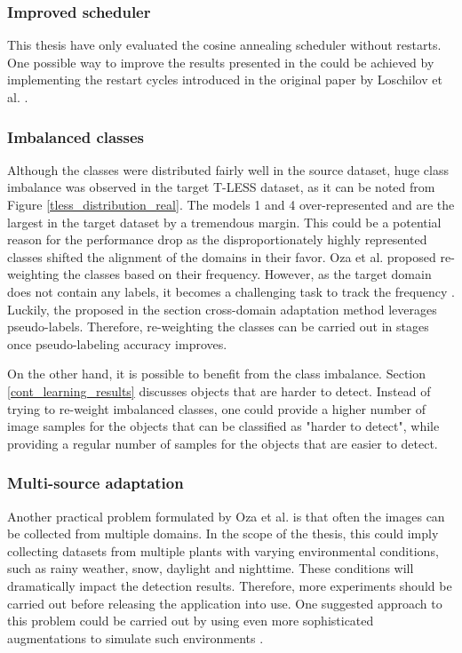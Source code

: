\documentclass[english, 12pt, a4paper, elec, utf8, a-1b, online]{aaltothesis}
\begin{document}
\subsubsection{Improved scheduler}
This thesis have only evaluated the cosine annealing scheduler without restarts. One possible way to improve the results presented in the  could be achieved by implementing the restart cycles introduced in the original paper by Loschilov et al. \cite{Loshchilov2016}.   


\subsubsection{Imbalanced classes}
Although the classes were distributed fairly well in the source dataset, huge class imbalance was observed in the target T-LESS dataset, as it can be noted from Figure \ref{tless_distribution_real}. The models 1 and 4 over-represented and are the largest in the target dataset by a tremendous margin. This could be a potential reason for the performance drop as the disproportionately highly represented classes shifted the alignment of the domains in their favor. Oza et al. proposed re-weighting the classes based on their frequency. However, as the target domain does not contain any labels, it becomes a challenging task to track the frequency \cite{Oza2021}. Luckily, the proposed in the  section cross-domain adaptation method leverages pseudo-labels. Therefore, re-weighting the classes can be carried out in stages once pseudo-labeling accuracy improves. 

On the other hand, it is possible to benefit from the class imbalance. Section \ref{cont_learning_results} discusses objects that are harder to detect. Instead of trying to re-weight imbalanced classes, one could provide a higher number of image samples for the objects that can be classified as "harder to detect", while providing a regular number of samples for the objects that are easier to detect.

\subsubsection{Multi-source adaptation}
Another practical problem formulated by Oza et al. is that often the images can be collected from multiple domains. In the scope of the thesis, this could imply collecting datasets from multiple plants with varying environmental conditions, such as rainy weather, snow, daylight and nighttime. These conditions will dramatically impact the detection results. Therefore, more experiments should be carried out before releasing the application into use. One suggested approach to this problem could be carried out by using even more sophisticated augmentations to simulate such environments \cite{imgaug}. 
\end{document}

